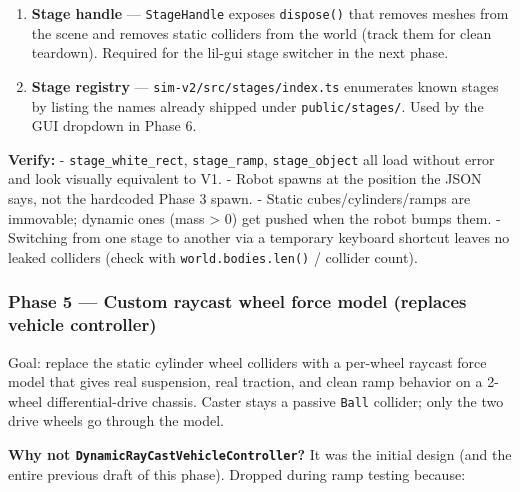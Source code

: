 \documentclass[
]{article}
\providecommand{\tightlist}{%
  \setlength{\itemsep}{0pt}\setlength{\parskip}{0pt}}
\begin{document}
\begin{enumerate}
  \begin{itemize}
  \tightlist
  \item
    Start with (a). Fall back to (b) only if Vite proxying gets in the
    way.
  \end{itemize}
\item
  \textbf{Stage handle} --- \texttt{StageHandle} exposes
  \texttt{dispose()} that removes meshes from the scene and removes
  static colliders from the world (track them for clean teardown).
  Required for the lil-gui stage switcher in the next phase.
\item
  \textbf{Stage registry} --- \texttt{sim-v2/src/stages/index.ts}
  enumerates known stages by listing the names already shipped under
  \texttt{public/stages/}. Used by the GUI dropdown in Phase 6.
\end{enumerate}

\textbf{Verify:} - \texttt{stage\_white\_rect}, \texttt{stage\_ramp},
\texttt{stage\_object} all load without error and look visually
equivalent to V1. - Robot spawns at the position the JSON says, not the
hardcoded Phase 3 spawn. - Static cubes/cylinders/ramps are immovable;
dynamic ones (mass \textgreater{} 0) get pushed when the robot bumps
them. - Switching from one stage to another via a temporary keyboard
shortcut leaves no leaked colliders (check with
\texttt{world.bodies.len()} / collider count).

\subsubsection{Phase 5 --- Custom raycast wheel force model (replaces
vehicle
controller)}\label{phase-5-custom-raycast-wheel-force-model-replaces-vehicle-controller}

Goal: replace the static cylinder wheel colliders with a per-wheel
raycast force model that gives real suspension, real traction, and clean
ramp behavior on a 2-wheel differential-drive chassis. Caster stays a
passive \texttt{Ball} collider; only the two drive wheels go through the
model.

\textbf{Why not \texttt{DynamicRayCastVehicleController}?} It was the
initial design (and the entire previous draft of this phase). Dropped
during ramp testing because:
\end{document}
